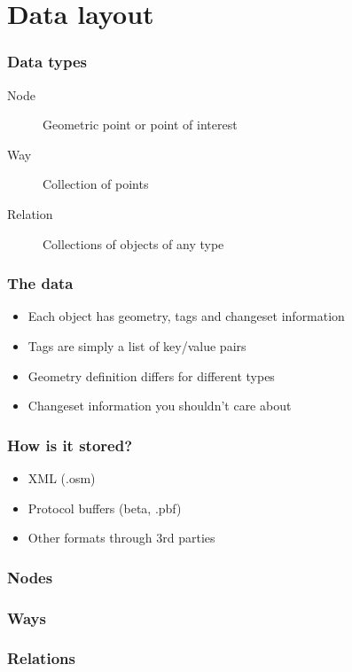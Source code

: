 \documentclass[14pt]{beamer}
\begin{document}
\section{Data layout}
\label{sec:diving}

\begin{frame}
  \frametitle{Data types}
  \begin{description}
  \item[Node] Geometric point or point of interest
  \item[Way] Collection of points
  \item[Relation] Collections of objects of any type
  \end{description}
\end{frame}

\begin{frame}
  \frametitle{The data}
  \begin{itemize}
  \item Each object has geometry, tags and changeset information
  \item Tags are simply a list of key/value pairs
  \item Geometry definition differs for different types
  \item Changeset information you shouldn't care about
  \end{itemize}
\end{frame}

\begin{frame}
  \frametitle{How is it stored?}
  \begin{itemize}
  \item XML (.osm)
  \item Protocol buffers (beta, .pbf)
  \item Other formats through 3rd parties
  \end{itemize}
\end{frame}

\begin{frame}
  \frametitle{Nodes}
\end{frame}

\begin{frame}
  \frametitle{Ways}
\end{frame}

\begin{frame}
  \frametitle{Relations}
\end{frame}
\end{document}
